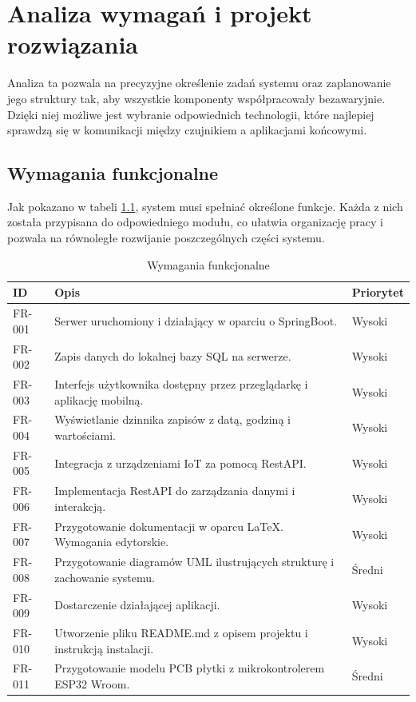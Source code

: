 \chapter{Analiza wymagań i projekt rozwiązania}
Analiza ta pozwala na precyzyjne określenie zadań systemu oraz zaplanowanie jego struktury tak, aby wszystkie komponenty współpracowały bezawaryjnie. Dzięki niej możliwe jest wybranie odpowiednich technologii, które najlepiej sprawdzą się w komunikacji między czujnikiem a aplikacjami końcowymi.

\section{Wymagania funkcjonalne}
Jak pokazano w tabeli \ref{tab:funkcjonalne}, system musi spełniać określone funkcje. Każda z nich została przypisana do odpowiedniego modułu, co ułatwia organizację pracy i pozwala na równoległe rozwijanie poszczególnych części systemu.
\begin{table}[ht!]
\centering
\caption{Wymagania funkcjonalne}
\label{tab:funkcjonalne}
\begin{tabular}{lll}
\toprule
ID & Opis & Priorytet \\  
\midrule
FR-001      & Serwer uruchomiony i działający w oparciu o SpringBoot.    & Wysoki \\
FR-002      & Zapis danych do lokalnej bazy SQL na serwerze.    & Wysoki \\ 
FR-003      & Interfejs użytkownika dostępny przez przeglądarkę i aplikację mobilną.    & Wysoki \\
FR-004      & Wyświetlanie dzinnika zapisów z datą, godziną i wartościami.    & Wysoki \\
FR-005      & Integracja z urządzeniami IoT za pomocą RestAPI.    & Wysoki \\
FR-006      & Implementacja RestAPI do zarządzania danymi i interakcją.    & Wysoki \\
FR-007      & Przygotowanie dokumentacji w oparcu LaTeX. Wymagania edytorskie.    & Wysoki \\
FR-008      & Przygotowanie diagramów UML ilustrujących strukturę i zachowanie systemu.    & Średni \\
FR-009      & Dostarczenie działającej aplikacji.    & Wysoki \\
FR-010      & Utworzenie pliku README.md z opisem projektu i instrukcją instalacji.    & Wysoki \\
FR-011      & Przygotowanie modelu PCB płytki z mikrokontrolerem ESP32 Wroom.    & Średni \\
\bottomrule 
\end{tabular}
\end{table}

